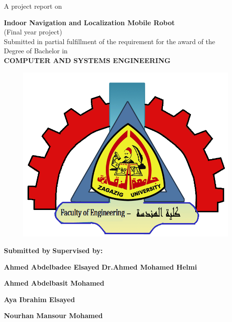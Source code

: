 \documentclass[12pt]{article}
\begin{document}
 
\begin{titlepage}
	
\thispagestyle{empty}

\begin{center}
\large {A project report on}

\Huge{\bfseries Indoor Navigation and Localization Mobile Robot }\\[0.5cm]
\large{(Final year project)}
 \\
 Submitted in partial fulfillment of the requirement for the award of the\\
 \large {Degree of Bachelor in }\\
 
 \large{\bfseries COMPUTER AND SYSTEMS ENGINEERING }\\
 
 \vspace{1.2cm}
 \begin{figure}[H]
\centering
\includegraphics[width =.45\textwidth]{Fig/faculty.png}

\end{figure}
 \vspace{.5cm}
\end{center}
 
\hspace{1cm} {\LARGE \bfseries Submitted by}  \hspace{3.5cm} {\LARGE \bfseries Supervised by:}


\hspace{0.5cm} {\bfseries  Ahmed Abdelbadee Elsayed}\hspace{2.5cm} {\bfseries  Dr.Ahmed Mohamed Helmi }

\hspace{0.5cm} {\bfseries Ahmed Abdelbasit Mohamed} 


\hspace{0.5cm} {\bfseries  Aya Ibrahim Elsayed} 


\hspace{0.5cm} {\bfseries Nourhan Mansour Mohamed} 



\end{titlepage}
\end{document}
